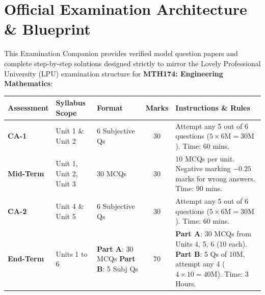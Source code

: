\chapter*{Official Examination Architecture \& Blueprint}

This Examination Companion provides verified model question papers and complete step-by-step solutions designed strictly to mirror the Lovely Professional University (LPU) examination structure for \textbf{MTH174: Engineering Mathematics}:

\begin{center}
\begin{tabularx}{\textwidth}{l p{3.2cm} p{2.8cm} c X}
\toprule
\textbf{Assessment} & \textbf{Syllabus Scope} & \textbf{Format} & \textbf{Marks} & \textbf{Instructions \& Rules} \\
\midrule
\textbf{CA-1} & Unit 1 \& Unit 2 & 6 Subjective Qs & 30 & Attempt any 5 out of 6 questions ($5 \times 6\text{M} = 30\text{M}$). Time: 60 mins. \\
\addlinespace
\textbf{Mid-Term} & Unit 1, Unit 2, Unit 3 & 30 MCQs & 30 & 10 MCQs per unit. Negative marking $-0.25$ marks for wrong answers. Time: 90 mins. \\
\addlinespace
\textbf{CA-2} & Unit 4 \& Unit 5 & 6 Subjective Qs & 30 & Attempt any 5 out of 6 questions ($5 \times 6\text{M} = 30\text{M}$). Time: 60 mins. \\
\addlinespace
\textbf{End-Term} & Units 1 to 6 & \textbf{Part A}: 30 MCQs \newline \textbf{Part B}: 5 Subj Qs & 70 & \textbf{Part A}: 30 MCQs from Units 4, 5, 6 (10 each). \newline \textbf{Part B}: 5 Qs of 10M, attempt any 4 ($4 \times 10 = 40\text{M}$). Time: 3 Hours. \\
\bottomrule
\end{tabularx}
\end{center}

\newpage
